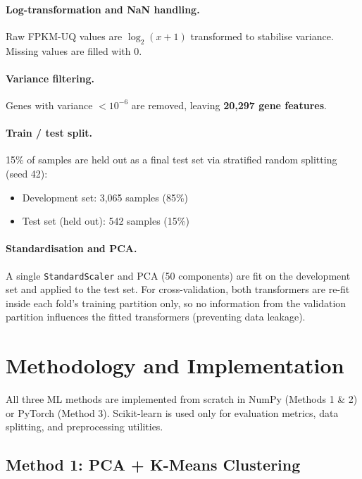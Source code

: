 \documentclass[11pt,letterpaper]{article}
\begin{document}
\paragraph{Log-transformation and NaN handling.}
Raw FPKM-UQ values are $\log_2(x+1)$ transformed to stabilise variance.
Missing values are filled with 0.

\paragraph{Variance filtering.}
Genes with variance $<10^{-6}$ are removed, leaving \textbf{20,297 gene
features}.

\paragraph{Train / test split.}
15\% of samples are held out as a final test set via stratified random
splitting (seed 42):
\begin{itemize}[leftmargin=2em,itemsep=0pt]
  \item Development set: 3,065 samples (85\%)
  \item Test set (held out): 542 samples (15\%)
\end{itemize}

\paragraph{Standardisation and PCA.}
A single \texttt{StandardScaler} and PCA (50 components) are fit on the
development set and applied to the test set.  For cross-validation, both
transformers are re-fit inside each fold's training partition only, so no
information from the validation partition influences the fitted transformers
(preventing data leakage).

\section{Methodology and Implementation}
\label{sec:methodology}

All three ML methods are implemented from scratch in NumPy (Methods 1 \& 2)
or PyTorch (Method 3).  Scikit-learn is used only for evaluation metrics,
data splitting, and preprocessing utilities.

\subsection{Method 1: PCA + K-Means Clustering}
\end{document}
